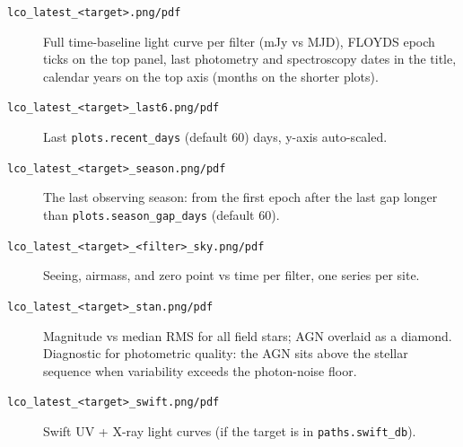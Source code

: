 \documentclass[12pt,a4paper]{article}
\begin{document}
\begin{description}
  \item[\texttt{lco\_\hspace{0pt}latest\_\hspace{0pt}<target>.png/\hspace{0pt}pdf}] Full time-baseline light curve
    per filter (mJy vs MJD), FLOYDS epoch ticks on the top panel, last
    photometry and spectroscopy dates in the title, calendar years on the top axis
    (months on the shorter plots).
  \item[\texttt{lco\_\hspace{0pt}latest\_\hspace{0pt}<target>\_\hspace{0pt}last6.png/\hspace{0pt}pdf}] Last
    \texttt{plots.recent\_\hspace{0pt}days} (default 60) days, y-axis auto-scaled.
  \item[\texttt{lco\_\hspace{0pt}latest\_\hspace{0pt}<target>\_\hspace{0pt}season.png/\hspace{0pt}pdf}] The last
    observing season: from the first epoch after the last gap longer than
    \texttt{plots.season\_\hspace{0pt}gap\_\hspace{0pt}days} (default 60).
  \item[\texttt{lco\_\hspace{0pt}latest\_\hspace{0pt}<target>\_\hspace{0pt}<filter>\_\hspace{0pt}sky.png/\hspace{0pt}pdf}] Seeing,
    airmass, and zero point vs time per filter, one series per site.
  \item[\texttt{lco\_\hspace{0pt}latest\_\hspace{0pt}<target>\_\hspace{0pt}stan.png/\hspace{0pt}pdf}] Magnitude vs median
    RMS for all field stars; AGN overlaid as a diamond.  Diagnostic for
    photometric quality: the AGN sits above the stellar sequence when
    variability exceeds the photon-noise floor.
  \item[\texttt{lco\_\hspace{0pt}latest\_\hspace{0pt}<target>\_\hspace{0pt}swift.png/\hspace{0pt}pdf}] Swift UV + X-ray
    light curves (if the target is in \texttt{paths.swift\_db}).
\end{description}
\end{document}
